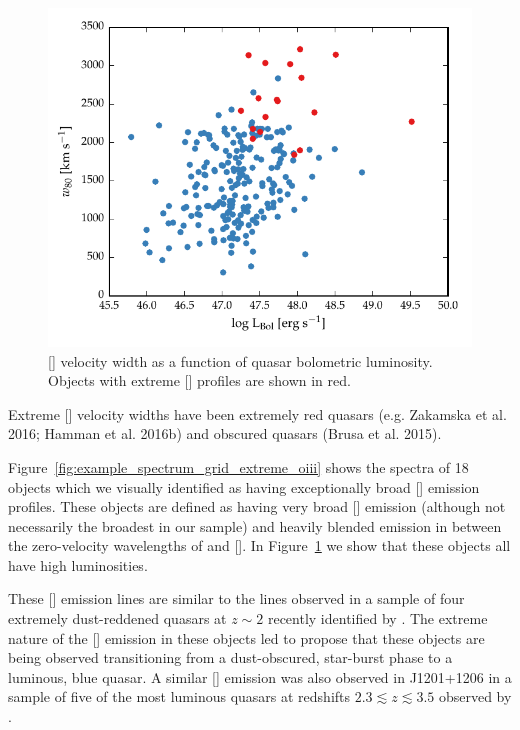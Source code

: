 \begin{figure}
    \centering
    \includegraphics[width=\columnwidth]{figures/chapter04/lum_w80.pdf} 
    \caption[{}]{[] velocity width as a function of quasar bolometric luminosity. Objects with extreme [] profiles are shown in red.}     
    \label{fig:lum_w80}
\end{figure}

Extreme [] velocity widths have been extremely red quasars (e.g. Zakamska et al. 2016; Hamman et al. 2016b) and obscured quasars (Brusa et al. 2015). 

Figure~\ref{fig:example_spectrum_grid_extreme_oiii} shows the spectra of 18 objects which we visually identified as having exceptionally broad [] emission profiles. 
These objects are defined as having very broad [] emission (although not necessarily the broadest in our sample) and heavily blended emission in between the zero-velocity wavelengths of \hb and []. 
In Figure~\ref{fig:lum_w80} we show that these objects all have high luminosities. 

These [] emission lines are similar to the lines observed in a sample of four extremely dust-reddened quasars at $z\sim2$ recently identified by \citet{zakamska16}. 
The extreme nature of the [] emission in these objects led \citet{zakamska16} to propose that these objects are being observed transitioning from a dust-obscured, star-burst phase to a luminous, blue quasar. 
A similar [] emission was also observed in J1201+1206 in a sample of five of the most luminous quasars at redshifts $2.3 \lesssim z \lesssim 3.5$ observed by \citet{bischetti16}.

